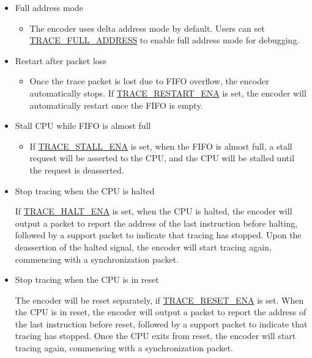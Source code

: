 \documentclass[main\_\_EN.tex]{subfiles}
\begin{document}
\begin{itemize}
    \item Full address mode
        \begin{itemize}
            \item The encoder uses delta address mode by default. Users can set \hyperref[fielddesc:TRACEFULLADDRESS]{TRACE\_FULL\_ADDRESS} to enable full address mode for debugging.
        \end{itemize}

        \item Restart after packet loss
            \begin{itemize}
                \item Once the trace packet is lost due to FIFO overflow, the encoder automatically stops. If \hyperref[fielddesc:TRACERESTARTENA]{TRACE\_RESTART\_ENA} is set, the encoder will automatically restart once the FIFO is empty.
            \end{itemize}

        \item Stall CPU while FIFO is almost full
            \begin{itemize}
                \item If \hyperref[fielddesc:TRACESTALLENA]{TRACE\_STALL\_ENA} is set, when the FIFO is almost full, a stall request will be asserted to the CPU, and the CPU will be stalled until the request is deasserted.
            \end{itemize}

        \item Stop tracing when the CPU is halted

            If \hyperref[fielddesc:TRACEHALTENA]{TRACE\_HALT\_ENA} is set, when the CPU is halted, the encoder will output a packet to report the address of the last instruction before halting, followed by a support packet to indicate that tracing has stopped. Upon the deassertion of the halted signal, the encoder will start tracing again, commencing with a synchronization packet.

        \item Stop tracing when the CPU is in reset

            The encoder will be reset separately, if \hyperref[fielddesc:TRACERESETENA]{TRACE\_RESET\_ENA} is set. When the CPU is in reset, the encoder will output a packet to report the address of the last instruction before reset, followed by a support packet to indicate that tracing has stopped. Once the CPU exits from reset, the encoder will start tracing again, commencing with a synchronization packet.


\end{itemize}
\end{document}
